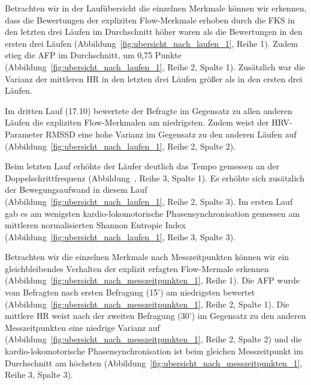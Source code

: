 Betrachten wir in der Laufübersicht die einzelnen Merkmale können wir erkennen, dass die Bewertungen der expliziten Flow-Merkmale erhoben durch die \ac{FKS} in den letzten drei Läufen im Durchschnitt höher waren als die Bewertungen in den ersten drei Läufen (Abbildung~\ref{fig:ubersicht_nach_laufen_1}, Reihe 1). Zudem stieg die \ac{AFP} im Durchschnitt, um 0,75 Punkte (Abbildung~\ref{fig:ubersicht_nach_laufen_1}, Reihe 2, Spalte 1). Zusätzlich war die Varianz der mittleren \ac{HR} in den letzten drei Läufen größer als in den ersten drei Läufen. 

Im dritten Lauf (17.10) bewertete der Befragte im Gegensatz zu allen anderen Läufen die expliziten Flow-Merkmalen am niedrigsten. Zudem weist der \ac{HRV}-Parameter \acs{RMSSD} eine hohe Varianz im Gegensatz zu den anderen Läufen auf (Abbildung~\ref{fig:ubersicht_nach_laufen_1}, Reihe 2, Spalte 2). 

Beim letzten Lauf erhöhte der Läufer deutlich das Tempo gemessen an der Doppelschrittfrequenz (Abbildung~, Reihe 3, Spalte 1). Es erhöhte sich zusätzlich der Bewegungsaufwand in diesem Lauf (Abbildung~\ref{fig:ubersicht_nach_laufen_1}, Reihe 2, Spalte 3). Im ersten Lauf gab es am wenigsten kardio-lokomotorische Phasensynchronisation gemessen am mittleren normalisierten Shannon Entropie Index (Abbildung~\ref{fig:ubersicht_nach_laufen_1}, Reihe 3, Spalte 3).

Betrachten wir die einzelnen Merkmale nach Messzeitpunkten können wir ein gleichbleibendes Verhalten der explizit erfagten Flow-Mermale erkennen (Abbildung~\ref{fig:ubersicht_nach_messzeitpunkten_1}, Reihe 1). Die \ac{AFP} wurde vom Befragten nach ersten Befragung (15') am niedrigsten bewertet (Abbildung~\ref{fig:ubersicht_nach_messzeitpunkten_1}, Reihe 2, Spalte 1). Die mittlere \ac{HR} weist nach der zweiten Befragung (30') im Gegensatz zu den anderen Messzeitpunkten eine niedrige Varianz auf (Abbildung~\ref{fig:ubersicht_nach_messzeitpunkten_1}, Reihe 2, Spalte 2) und die kardio-lokomotorische Phasensynchronisation ist beim gleichen Messzeitpunkt im Durchschnitt am höchsten (Abbildung~\ref{fig:ubersicht_nach_messzeitpunkten_1}, Reihe 3, Spalte 3). 

